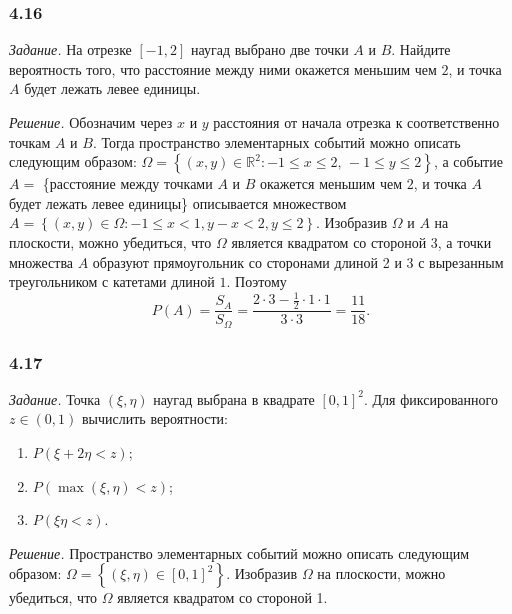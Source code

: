 \subsubsection*{4.16}

\textit{Задание.} На отрезке $ \left[ -1, 2 \right] $ наугад выбрано две точки $A$ и $B$.
Найдите вероятность того, что расстояние между ними окажется меньшим чем $2$, и точка $A$ будет лежать левее единицы.

\textit{Решение.} Обозначим через $x$ и $y$ расстояния от начала отрезка к соответственно точкам $A$ и $B$.
Тогда пространство элементарных событий можно описать следующим образом:
$ \Omega =
\left\{ \left( x, y \right) \in \mathbb{R}^2: -1 \leq x \leq 2, \, -1 \leq y \leq 2 \right\}$,
а событие $A = $ \{расстояние между точками $A$ и $B$ окажется меньшим чем $2$, и точка $A$ будет лежать левее единицы\}
описывается множеством $A = \left\{ \left( x, y \right) \in \Omega: -1 \leq x < 1, y - x < 2, y \leq 2 \right\}$.
Изобразив $ \Omega $ и $A$ на плоскости, можно убедиться, что $ \Omega $ является квадратом со стороной $3$,
а точки множества $A$ образуют прямоугольник со сторонами длиной 2 и 3 с вырезанным треугольником с катетами длиной $1$.
Поэтому
$$P \left( A \right) =
\frac{S_A}{S_{ \Omega }} =
\frac{2 \cdot 3 - \frac{1}{2} \cdot 1 \cdot 1}{3 \cdot 3} =
\frac{11}{18}.$$

\subsubsection*{4.17}

\textit{Задание.} Точка $ \left( \xi, \eta \right) $ наугад выбрана в квадрате $ \left[ 0, 1 \right]^2$.
Для фиксированного $z \in \left( 0, 1 \right) $ вычислить вероятности:
\begin{enumerate}[label=\alph*)]
\item $P \left( \xi + 2 \eta < z \right) $;
\item $P \left( \max \left( \xi, \eta \right) < z \right) $;
\item $P \left( \xi \eta < z \right) $.
\end{enumerate}

\textit{Решение.} Пространство элементарных событий можно описать следующим образом:
$ \Omega =
\left\{ \left( \xi, \eta \right) \in \left[ 0, 1 \right]^2 \right\}$.
Изобразив $ \Omega $ на плоскости, можно убедиться, что $ \Omega $ является квадратом со стороной 1.

